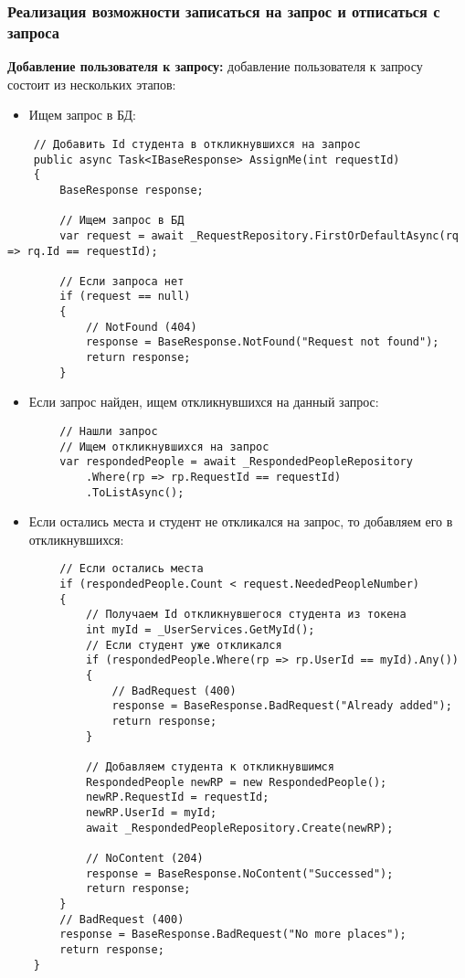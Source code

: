 \subsubsection{Реализация возможности записаться на запрос и отписаться с запроса}

\textbf{Добавление пользователя к запросу:} добавление пользователя к запросу состоит из нескольких этапов:
\begin{itemize}
	\item{Ищем запрос в БД:}
\end{itemize}
\begin{verbatim}
    // Добавить Id студента в откликнувшихся на запрос
    public async Task<IBaseResponse> AssignMe(int requestId)
    {
        BaseResponse response;

        // Ищем запрос в БД
        var request = await _RequestRepository.FirstOrDefaultAsync(rq => rq.Id == requestId);

        // Если запроса нет
        if (request == null)
        {
            // NotFound (404)
            response = BaseResponse.NotFound("Request not found");
            return response;
        }

\end{verbatim}

\begin{itemize}
	\item{Если запрос найден, ищем откликнувшихся на данный запрос:}
\end{itemize}
\begin{verbatim}
        // Нашли запрос
        // Ищем откликнувшихся на запрос
        var respondedPeople = await _RespondedPeopleRepository
            .Where(rp => rp.RequestId == requestId)
            .ToListAsync();
\end{verbatim}

\begin{itemize}
	\item{Если остались места и студент не откликался на запрос, то добавляем его в откликнувшихся:}
\end{itemize}
\begin{verbatim}
        // Если остались места
        if (respondedPeople.Count < request.NeededPeopleNumber)
        {
            // Получаем Id откликнувшегося студента из токена
            int myId = _UserServices.GetMyId();
            // Если студент уже откликался
            if (respondedPeople.Where(rp => rp.UserId == myId).Any())
            {
                // BadRequest (400)
                response = BaseResponse.BadRequest("Already added");
                return response;
            }

            // Добавляем студента к откликнувшимся
            RespondedPeople newRP = new RespondedPeople();
            newRP.RequestId = requestId;
            newRP.UserId = myId;
            await _RespondedPeopleRepository.Create(newRP);

            // NoContent (204)
            response = BaseResponse.NoContent("Successed");
            return response;
        }
        // BadRequest (400)
        response = BaseResponse.BadRequest("No more places");
        return response;
    }
\end{verbatim}


